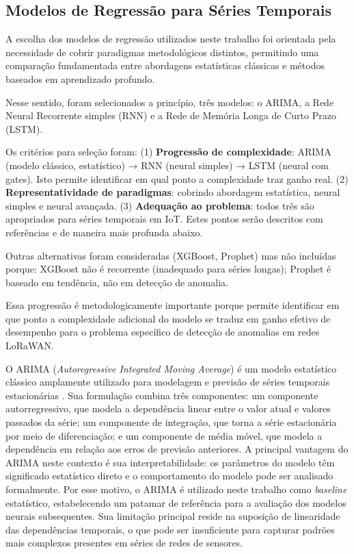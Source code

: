 
\subsection{Modelos de Regressão para Séries Temporais}

A escolha dos modelos de regressão utilizados neste trabalho foi orientada 
pela necessidade de cobrir paradigmas metodológicos distintos, permitindo 
uma comparação fundamentada entre abordagens estatísticas clássicas e 
métodos baseados em aprendizado profundo. 

Nesse sentido, foram selecionados a princípio, 
três modelos: o ARIMA, a Rede Neural Recorrente simples (RNN) e a Rede de 
Memória Longa de Curto Prazo (LSTM). 

Os critérios para seleção foram:
(1) \textbf{Progressão de complexidade}: ARIMA (modelo clássico, estatístico) 
→ RNN (neural simples) → LSTM (neural com gates). Isto permite identificar 
em qual ponto a complexidade traz ganho real.
(2) \textbf{Representatividade de paradigmas}: cobrindo abordagem 
estatística, neural simples e neural avançada.
(3) \textbf{Adequação ao problema}: todos três são apropriados para séries 
temporais em IoT.
Estes pontos serão descritos com referências e de maneira mais profunda abaixo.

Outras alternativas foram consideradas (XGBoost, Prophet) mas não incluídas 
porque: XGBoost não é recorrente (inadequado para séries longas); Prophet é 
baseado em tendência, não em detecção de anomalia.

Essa progressão é metodologicamente 
importante porque permite identificar em que ponto a complexidade adicional 
do modelo se traduz em ganho efetivo de desempenho para o problema específico 
de detecção de anomalias em redes LoRaWAN.

O ARIMA (\textit{Autoregressive Integrated Moving Average}) é um modelo 
estatístico clássico amplamente utilizado para modelagem e previsão de séries 
temporais estacionárias \cite{box2015}. Sua formulação combina três 
componentes: um componente autorregressivo, que modela a dependência linear 
entre o valor atual e valores passados da série; um componente de integração, 
que torna a série estacionária por meio de diferenciação; e um componente de 
média móvel, que modela a dependência em relação aos erros de previsão 
anteriores. A principal vantagem do ARIMA neste contexto é sua 
interpretabilidade: os parâmetros do modelo têm significado estatístico 
direto e o comportamento do modelo pode ser analisado formalmente. Por esse 
motivo, o ARIMA é utilizado neste trabalho como \textit{baseline} estatístico, 
estabelecendo um patamar de referência para a avaliação dos modelos neurais 
subsequentes. Sua limitação principal reside na suposição de linearidade das 
dependências temporais, o que pode ser insuficiente para capturar padrões 
mais complexos presentes em séries de redes de sensores.


